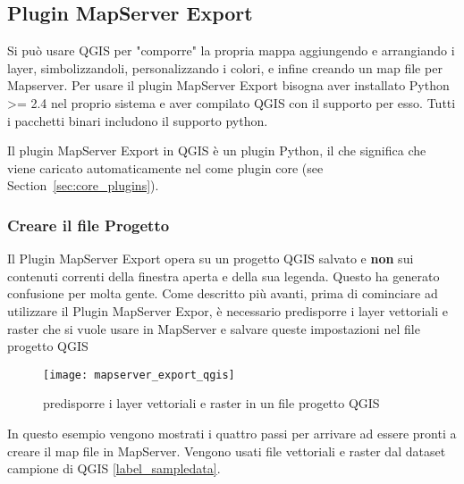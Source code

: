 
\subsection{Plugin MapServer Export}\label{sec:mapserver_export}


Si può usare QGIS per "comporre" la propria mappa aggiungendo e arrangiando i layer, simbolizzandoli, personalizzando i colori, e infine creando un map file per Mapserver. Per usare il plugin MapServer Export bisogna aver installato Python >= 2.4 nel proprio sistema e aver compilato QGIS con il supporto per esso. Tutti i pacchetti binari includono il supporto python.

Il plugin MapServer Export in QGIS \CURRENT è un plugin Python, il che significa che viene caricato automaticamente nel   come plugin core 
(see Section~\ref{sec:core_plugins}).

\subsubsection{Creare il file Progetto}

Il Plugin MapServer Export opera su un progetto QGIS salvato e 
\textbf{non} sui contenuti correnti della finestra aperta e della sua legenda. Questo ha generato confusione per molta gente.  Come descritto più avanti, prima di cominciare ad utilizzare il Plugin MapServer Expor, è necessario predisporre i layer vettoriali e raster che si vuole usare in MapServer e salvare queste impostazioni nel file progetto QGIS

\begin{figure}[ht]
\begin{center}
  \caption{predisporre i layer vettoriali e raster in un file progetto QGIS \nixcaption}
  \label{fig:mapserver_export_qgs}\smallskip
  \texttt{[image: mapserver\_export\_qgis]}
\end{center}
\end{figure}

In questo esempio vengono mostrati i quattro passi per arrivare ad essere pronti a creare il map file in MapServer. Vengono usati file vettoriali e raster dal dataset campione di QGIS \ref{label_sampledata}.


